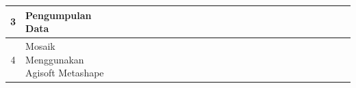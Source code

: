 \begin{table}[H]
{\begin{tabular}{|c|l|llll|llll|llll|llll|llll|llll|}
  3                    & Pengumpulan Data                              & \multicolumn{1}{l|}{}                         & \multicolumn{1}{l|}{}                         & \multicolumn{1}{l|}{}                         &                          & \multicolumn{1}{l|}{} & \multicolumn{1}{l|}{} & \multicolumn{1}{l|}{} &                          & \multicolumn{1}{l|}{}                         & \multicolumn{1}{l|}{}                         & \multicolumn{1}{l|}{}                         &                          \cellcolor[HTML]{656565}& \multicolumn{1}{l|}{\cellcolor[HTML]{656565}}                                                & \multicolumn{1}{l|}{\cellcolor[HTML]{656565}}                                                & \multicolumn{1}{l|}{}                         &                          & \multicolumn{1}{l|}{}                         & \multicolumn{1}{l|}{}                         & \multicolumn{1}{l|}{}                         &                          & \multicolumn{1}{l|}{}                         & \multicolumn{1}{l|}{}                         & \multicolumn{1}{l|}{}                         &                          \\ \hline
  4                    & Mosaik Menggunakan Agisoft Metashape                     & \multicolumn{1}{l|}{}                         & \multicolumn{1}{l|}{}                         & \multicolumn{1}{l|}{}                         &                          & \multicolumn{1}{l|}{}                         & \multicolumn{1}{l|}{}                         & \multicolumn{1}{l|}{} & & \multicolumn{1}{l|}{} & \multicolumn{1}{l|}{} & \multicolumn{1}{l|}{} & & \multicolumn{1}{l|}{\cellcolor[HTML]{656565}}                                                & \multicolumn{1}{l|}{\cellcolor[HTML]{656565}}                                                & \multicolumn{1}{l|}{\cellcolor[HTML]{656565}}                         &                          \cellcolor[HTML]{656565}& \multicolumn{1}{l|}{}                         & \multicolumn{1}{l|}{}                         & \multicolumn{1}{l|}{}                         &                          & \multicolumn{1}{l|}{}                         & \multicolumn{1}{l|}{}                         & \multicolumn{1}{l|}{}                         &                          \\ \hline

\end{tabular}}
\end{table}
